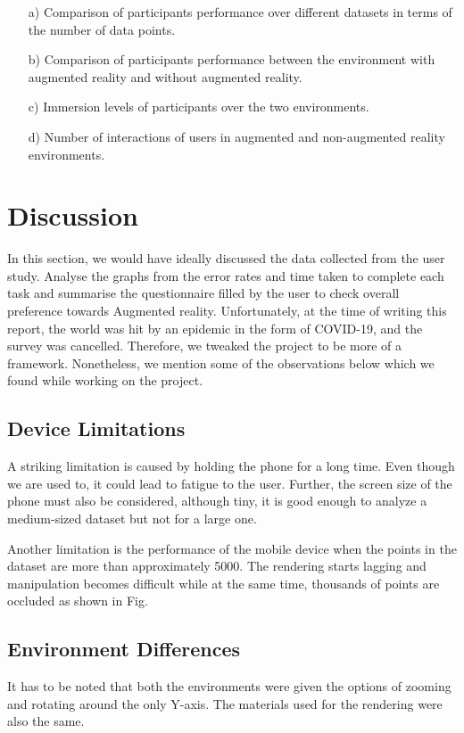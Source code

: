 \documentclass[journal]{vgtc}                %
\begin{document}
\begin{enumerate}
    \item[a)] Comparison of participants performance over different datasets in terms of the number of data points.
    \item[b)] Comparison of participants performance between the environment with augmented reality and without augmented reality.
    \item[c)] Immersion levels of participants over the two environments.
    \item[d)] Number of interactions of users in augmented and non-augmented reality environments.
\end{enumerate}
 
\section{Discussion}
In this section, we would have ideally discussed the data collected from the user study. Analyse the graphs from the error rates and time taken to complete each task and summarise the questionnaire filled by the user to check overall preference towards Augmented reality. Unfortunately, at the time of writing this report, the world was hit by an epidemic in the form of COVID-19\cite{Velavan2020}, and the survey was cancelled. Therefore, we tweaked the project to be more of a framework. Nonetheless, we mention some of the observations below which we found while working on the project. 

\subsection{Device Limitations}

A striking limitation is caused by holding the phone for a long time. Even though we are used to, it could lead to fatigue to the user. Further, the screen size of the phone must also be considered, although tiny, it is good enough to analyze a medium-sized dataset but not for a large one.

Another limitation is the performance of the mobile device when the points in the dataset are more than approximately 5000. The rendering starts lagging and manipulation becomes difficult while at the same time, thousands of points are occluded as shown in Fig.

\subsection{Environment Differences}
It has to be noted that both the environments were given the options of zooming and rotating around the only Y-axis. The materials used for the rendering were also the same.
\end{document}
